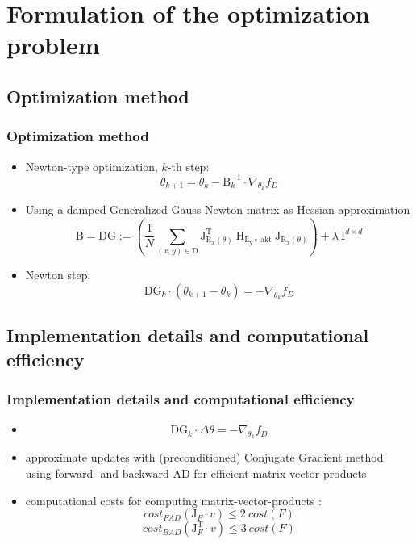 



\beamertemplatenavigationsymbolsempty{}


\section{Formulation of the optimization problem}

  \subsection{Optimization method}
  \begin{frame}
  \frametitle{Optimization method}
  \begin{itemize}
  	\item Newton-type optimization, $k$-th step: 
  	$$\theta_{k+1} = \theta_{k} - \mathrm{B}_{k}^{-1}\cdot\nabla_{\theta_{k}} f_{D}$$%
  	\pause
  	\item Using a damped Generalized Gauss Newton matrix as Hessian approximation
  	$$\mathrm{B} = \mathrm{DG} := \left(\frac{1}{N}\sum_{(x, y)\in\mathrm{D}}^{}\mathrm{J}_{\mathrm{R}_{x}(\theta)}^{\mathrm{T}}\:\mathrm{H}_{\mathrm{L_{y}\circ\:\text{akt}}}\:\mathrm{J}_{\mathrm{R}_{x}(\theta)}\right) + \lambda\:\mathrm{I}^{d\times d} $$
  	\item[] Newton step:
  	$$\mathrm{DG}_{k}\cdot (\theta_{k+1} - \theta_{k}) = -\nabla_{\theta_{k}}f_{D}$$
  \end{itemize}
\end{frame}

\subsection{Implementation details and computational efficiency}
\begin{frame}
\frametitle{Implementation details and computational efficiency}
\begin{itemize}
	\item[] $$\mathrm{DG}_{k}\cdot \Delta\theta = -\nabla_{\theta_{k}}f_{D}$$
	\item approximate updates with (preconditioned) Conjugate Gradient method using forward- and backward-AD for efficient matrix-vector-products
	\pause
	\item computational costs for computing matrix-vector-products :
	$$cost_{FAD}(\mathrm{J}_{F}\cdot v)\leq 2\:cost(F)$$
	$$cost_{BAD}(\mathrm{J}_{F}^{\mathrm{T}}\cdot v)\leq 3\:cost(F)$$
\end{itemize}
\end{frame}
